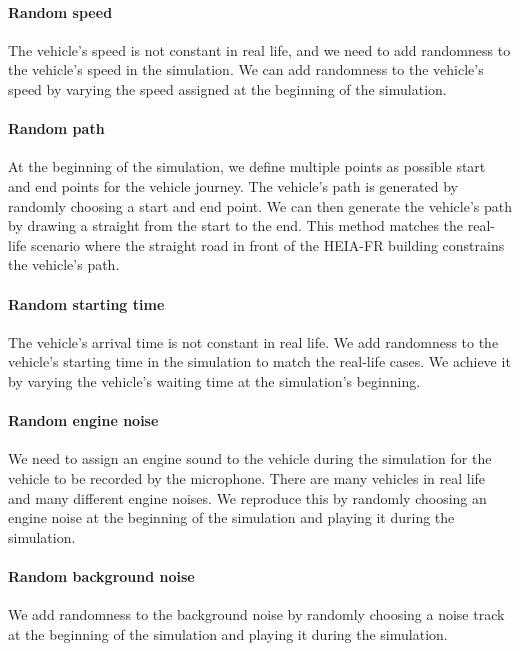 \paragraph{Random speed}

The vehicle's speed is not constant in real life, and we need to add randomness to the vehicle's speed in the simulation. We can add randomness to the vehicle's speed by varying the speed assigned at the beginning of the simulation. 

\paragraph{Random path}

At the beginning of the simulation, we define multiple points as possible start and end points for the vehicle journey. The vehicle's path is generated by randomly choosing a start and end point. We can then generate the vehicle's path by drawing a straight from the start to the end. This method matches the real-life scenario where the straight road in front of the HEIA-FR building constrains the vehicle's path. 

\paragraph{Random starting time}

The vehicle's arrival time is not constant in real life. We add randomness to the vehicle's starting time in the simulation to match the real-life cases. We achieve it by varying the vehicle's waiting time at the simulation's beginning.

\paragraph{Random engine noise}

We need to assign an engine sound to the vehicle during the simulation for the vehicle to be recorded by the microphone. There are many vehicles in real life and many different engine noises. We reproduce this by randomly choosing an engine noise at the beginning of the simulation and playing it during the simulation. 

\paragraph{Random background noise}

We add randomness to the background noise by randomly choosing a noise track at the beginning of the simulation and playing it during the simulation.

